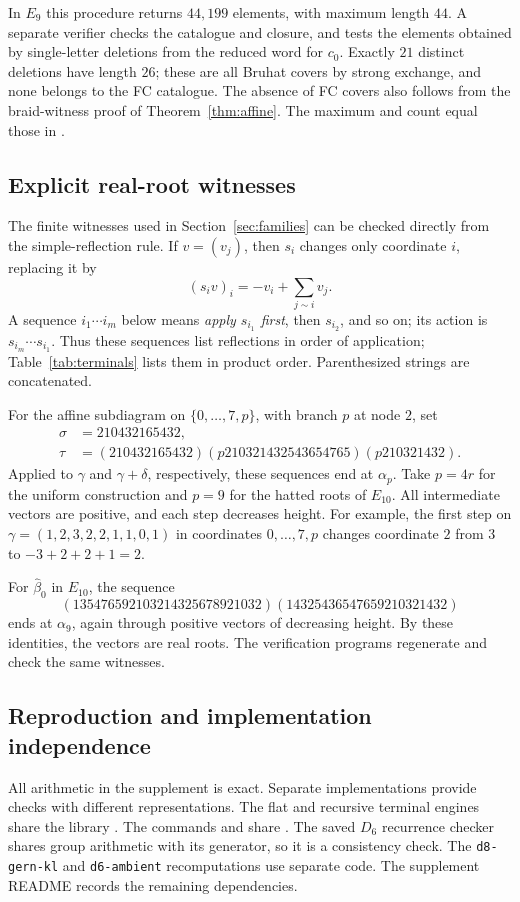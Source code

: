 \documentclass[10pt]{article}
\theoremstyle{remark}
\begin{document}
In $E_9$ this procedure returns $44{,}199$ elements, with maximum length
$44$. A separate verifier checks the catalogue and closure, and tests
the elements obtained by single-letter deletions from the reduced word
for $c_0$. Exactly $21$ distinct deletions have length $26$; these are all
Bruhat covers by strong exchange, and none belongs to the FC catalogue.
The absence of FC covers also follows from the braid-witness proof of
Theorem~\ref{thm:affine}. The maximum and count equal those in
\cite[\S5.2]{BJN}.

\subsection{Explicit real-root witnesses}\label{app:roots}
The finite witnesses used in Section~\ref{sec:families} can be checked
directly from the simple-reflection rule. If $v=(v_j)$, then $s_i$ changes
only coordinate $i$, replacing it by
\[
 (s_iv)_i=-v_i+\sum_{j\sim i}v_j.
\]
A sequence $i_1\cdots i_m$ below means \emph{apply $s_{i_1}$ first},
then $s_{i_2}$, and so on; its action is $s_{i_m}\cdots s_{i_1}$.
Thus these sequences list reflections in order of application;
Table~\ref{tab:terminals} lists them in product order. Parenthesized
strings are concatenated.

For the affine subdiagram on $\{0,\ldots,7,p\}$, with branch $p$ at
node $2$, set
\[
 \begin{split}
 \sigma&=210432165432,\\
 \tau&=(210432165432)(p210321432543654765)(p210321432).
 \end{split}
\]
Applied to $\gamma$ and $\gamma+\delta$, respectively, these sequences
end at $\alpha_p$. Take $p=4r$ for the uniform construction and $p=9$
for the hatted roots of $E_{10}$. All intermediate vectors are positive,
and each step decreases height. For example, the first step on
$\gamma=(1,2,3,2,2,1,1,0,1)$ in coordinates $0,\ldots,7,p$ changes
coordinate $2$ from $3$ to $-3+2+2+1=2$.

For $\hat\beta_0$ in $E_{10}$, the sequence
\[
 (135476592103214325678921032)
 (14325436547659210321432)
\]
ends at $\alpha_9$, again through positive vectors of decreasing height.
By these identities, the vectors are real roots. The verification programs
regenerate and check the same witnesses.

\subsection{Reproduction and implementation independence}
All arithmetic in the supplement is exact. Separate implementations
provide checks with different representations. The flat and recursive
terminal engines share the library .
The commands  and  share
. The saved $D_6$ recurrence checker shares group
arithmetic with its generator, so it is a consistency check. The
\texttt{d8-gern-kl} and \texttt{d6-ambient} recomputations use separate
code. The supplement README records the remaining dependencies.
\end{document}

